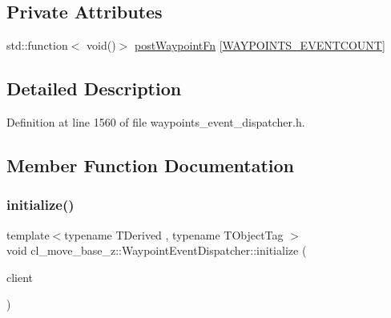 \subsection*{Private Attributes}
\begin{DoxyCompactItemize}
\item 
std\+::function$<$ void()$>$ \hyperlink{classcl__move__base__z_1_1WaypointEventDispatcher_a964a57fcce5d48ec60243230722d8dd7}{post\+Waypoint\+Fn} \mbox{[}\hyperlink{waypoints__event__dispatcher_8h_add4ce0c5d955be6047a4820c63e7df08}{W\+A\+Y\+P\+O\+I\+N\+T\+S\+\_\+\+E\+V\+E\+N\+T\+C\+O\+U\+NT}\mbox{]}
\end{DoxyCompactItemize}


\subsection{Detailed Description}


Definition at line 1560 of file waypoints\+\_\+event\+\_\+dispatcher.\+h.



\subsection{Member Function Documentation}
\mbox{\label{classcl__move__base__z_1_1WaypointEventDispatcher_a89674461d32af85dd64ca49290dbd010}} 
\subsubsection{\texorpdfstring{initialize()}{initialize()}}
{\footnotesize\ttfamily template$<$typename T\+Derived , typename T\+Object\+Tag $>$ \\
void cl\+\_\+move\+\_\+base\+\_\+z\+::\+Waypoint\+Event\+Dispatcher\+::initialize (\begin{DoxyParamCaption}\item[{\hyperlink{classcl__move__base__z_1_1ClMoveBaseZ}{Cl\+Move\+BaseZ} $\ast$}]{client }\end{DoxyParamCaption})}



